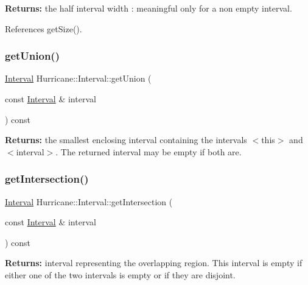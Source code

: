 {\bfseries Returns\+:} the half interval width \+: meaningful only for a non empty interval. 

References get\+Size().

\mbox{\label{classHurricane_1_1Interval_adaddabee8381860b0d6913ce39bc1911}} 
\subsubsection{\texorpdfstring{get\+Union()}{getUnion()}}
{\footnotesize\ttfamily \mbox{\hyperlink{classHurricane_1_1Interval}{Interval}} Hurricane\+::\+Interval\+::get\+Union (\begin{DoxyParamCaption}\item[{const \mbox{\hyperlink{classHurricane_1_1Interval}{Interval}} \&}]{interval }\end{DoxyParamCaption}) const}

{\bfseries Returns\+:} the smallest enclosing interval containing the intervals {\ttfamily $<$this$>$} and {\ttfamily $<$interval$>$}. The returned interval may be empty if both are. \mbox{\label{classHurricane_1_1Interval_ad9baf434d669fddf9cd30aa74e0c4486}} 
\subsubsection{\texorpdfstring{get\+Intersection()}{getIntersection()}}
{\footnotesize\ttfamily \mbox{\hyperlink{classHurricane_1_1Interval}{Interval}} Hurricane\+::\+Interval\+::get\+Intersection (\begin{DoxyParamCaption}\item[{const \mbox{\hyperlink{classHurricane_1_1Interval}{Interval}} \&}]{interval }\end{DoxyParamCaption}) const}

{\bfseries Returns\+:} interval representing the overlapping region. This interval is empty if either one of the two intervals is empty or if they are disjoint. \mbox{\label{classHurricane_1_1Interval_a5bf0292743d02f861a194c48c823c7ce}} 
